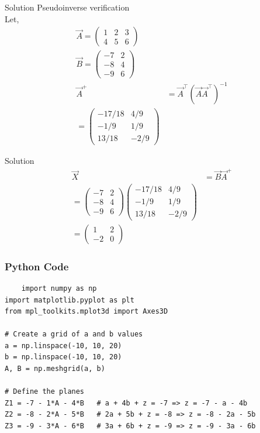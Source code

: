 \documentclass{beamer}
\begin{document}
\begin{frame}{Solution}
Pseudoinverse verification\\
Let,
\begin{align}
\Vec{A} = \begin{pmatrix}1 & 2 & 3 \\ 4 & 5 & 6\end{pmatrix}\\
\Vec{B} = \begin{pmatrix}-7 & 2 \\ -8 & 4 \\ -9 & 6\end{pmatrix} \\
\Vec{A}^+ &= \Vec{A}^\top (\Vec{A}\Vec{A}^\top)^{-1} \\  
= \begin{pmatrix}
-17/18 & 4/9 \\
-1/9 & 1/9 \\
13/18 & -2/9
\end{pmatrix} 
\end{align}
\end{frame}
\begin{frame}{Solution}
\begin{align}
\Vec{X} &= \Vec{B}\Vec{A}^+ \\  
= \begin{pmatrix}-7 & 2 \\ -8 & 4 \\ -9 & 6\end{pmatrix} 
\begin{pmatrix}-17/18 & 4/9 \\ -1/9 & 1/9 \\ 13/18 & -2/9\end{pmatrix} \\ 
=\begin{pmatrix}1 & 2 \\ -2 & 0\end{pmatrix} 
\end{align} 
\end{frame}
\begin{frame}[fragile]
\frametitle{Python Code}
\begin{lstlisting}
    import numpy as np
import matplotlib.pyplot as plt
from mpl_toolkits.mplot3d import Axes3D

# Create a grid of a and b values
a = np.linspace(-10, 10, 20)
b = np.linspace(-10, 10, 20)
A, B = np.meshgrid(a, b)

# Define the planes
Z1 = -7 - 1*A - 4*B   # a + 4b + z = -7 => z = -7 - a - 4b
Z2 = -8 - 2*A - 5*B   # 2a + 5b + z = -8 => z = -8 - 2a - 5b
Z3 = -9 - 3*A - 6*B   # 3a + 6b + z = -9 => z = -9 - 3a - 6b

\end{lstlisting}
\end{frame}
\end{document}
